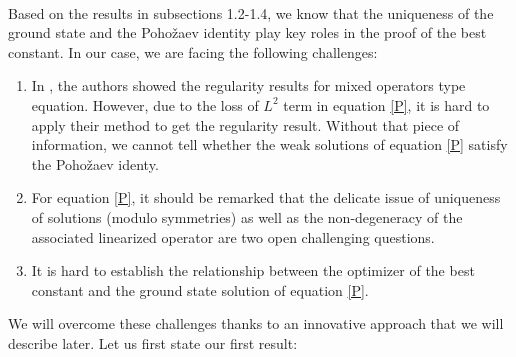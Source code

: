 \documentclass[12pt,a4paper,reqno]{amsart}
\numberwithin{equation}{section}
\begin{document}
$~$\\
Based on the results in subsections 1.2-1.4, we know that the uniqueness of the ground state and the Poho\v{z}aev identity play key roles in the proof of the best constant.
In our case, we are facing the following challenges:

\begin{enumerate}
\item [(i)]
In
\cite{Dipierro-SuXF-Valdinoci-ZhangJW2025DCDS,Su-Valdinoci-Wei-Zhang2022MZ,Su-Valdinoci-Wei-Zhang2025JDE},
the authors showed the regularity results for  mixed operators type equation.
However, due to the loss of $L^{2}$ term in equation \eqref{P},
it is hard to apply their method to get the regularity result.
Without that piece of information, we cannot tell whether the weak solutions of equation \eqref{P} satisfy the Poho\v{z}aev identy.

\item [(ii)]
For equation \eqref{P},
it should be remarked that the delicate issue of uniqueness of solutions (modulo symmetries) as well as the non-degeneracy of the associated linearized operator are two open challenging questions.


\item [(iii)]
It is hard to establish the relationship between the optimizer of the best constant
and the ground state solution of equation \eqref{P}.
\end{enumerate}

We will overcome these challenges thanks to an innovative approach that we will describe later. Let us first state our first result:


\end{document}
